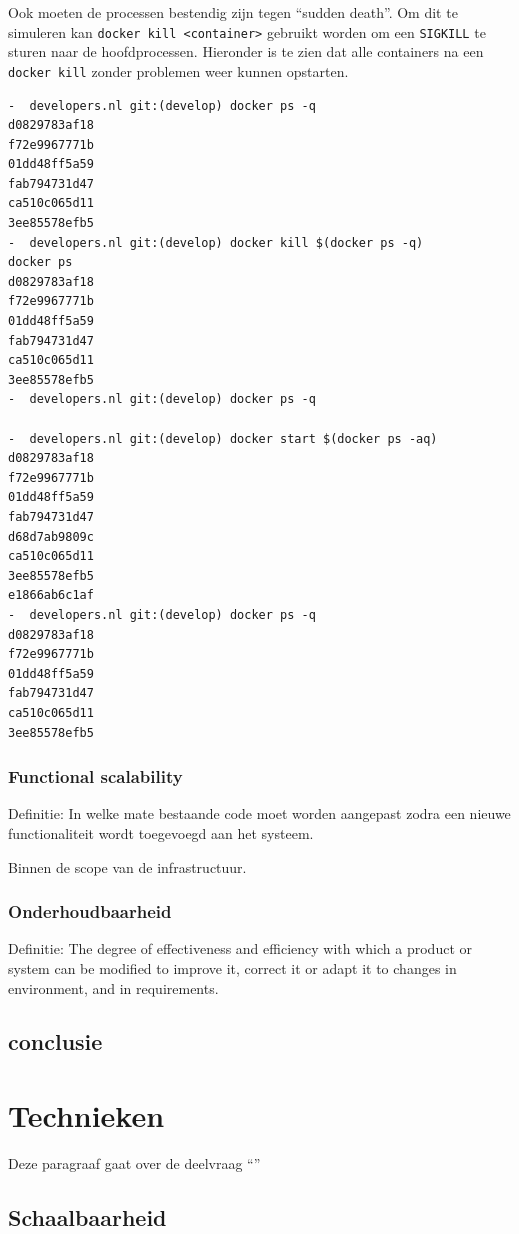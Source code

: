 Ook moeten de processen bestendig zijn tegen \enquote{sudden death}. Om dit te simuleren kan \texttt{docker kill <container>} gebruikt worden om een \texttt{SIGKILL} te sturen naar de hoofdprocessen. Hieronder is te zien dat alle containers na een \texttt{docker kill} zonder problemen weer kunnen opstarten.

\begin{verbatim}
-  developers.nl git:(develop) docker ps -q
d0829783af18
f72e9967771b
01dd48ff5a59
fab794731d47
ca510c065d11
3ee85578efb5
-  developers.nl git:(develop) docker kill $(docker ps -q) 
docker ps
d0829783af18
f72e9967771b
01dd48ff5a59
fab794731d47
ca510c065d11
3ee85578efb5
-  developers.nl git:(develop) docker ps -q

-  developers.nl git:(develop) docker start $(docker ps -aq)
d0829783af18
f72e9967771b
01dd48ff5a59
fab794731d47
d68d7ab9809c
ca510c065d11
3ee85578efb5
e1866ab6c1af
-  developers.nl git:(develop) docker ps -q
d0829783af18
f72e9967771b
01dd48ff5a59
fab794731d47
ca510c065d11
3ee85578efb5
\end{verbatim}



\subsubsection{Functional scalability}
Definitie: In welke mate bestaande code moet worden aangepast zodra een nieuwe functionaliteit wordt toegevoegd aan het systeem.

Binnen de scope van de infrastructuur.

\subsubsection{Onderhoudbaarheid}
Definitie: The degree of effectiveness and efficiency with which a product or system can be modified to improve it, correct it or adapt it to changes in environment, and in requirements.

\subsection{conclusie}

\section{Technieken}
Deze paragraaf gaat over de deelvraag \enquote{\deeltechnieken}

\subsection{Schaalbaarheid}

